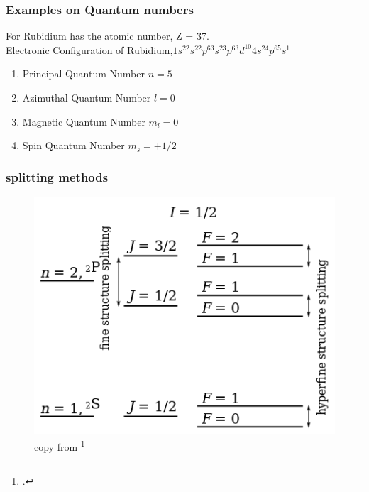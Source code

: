 \documentclass[18 pt]{beamer}
\begin{document}
\begin{frame}
  \frametitle{Examples on Quantum numbers}
  For Rubidium has the atomic number, Z = 37.\\
  Electronic Configuration of Rubidium,\(1s^22s^22p^63s^23p^63d^{10}4s^24p^65s^1\)
  \begin{enumerate}
    \item Principal Quantum Number \(n = 5\)
    \item Azimuthal Quantum Number \(l = 0\)
    \item Magnetic Quantum Number \(m_l = 0\)
    \item Spin Quantum Number \(m_s = +1/2\)
  \end{enumerate}
\end{frame}
\begin{frame}
  \frametitle{splitting methods}
  \begin{figure}
    \includegraphics[width=.6\linewidth]{440px-Fine_hyperfine_levels.svg.png}
    \caption{copy from \footcite{https://en.wikipedia.org/wiki/Hyperfine_structure}}
  \end{figure}
\end{frame}
\end{document}
